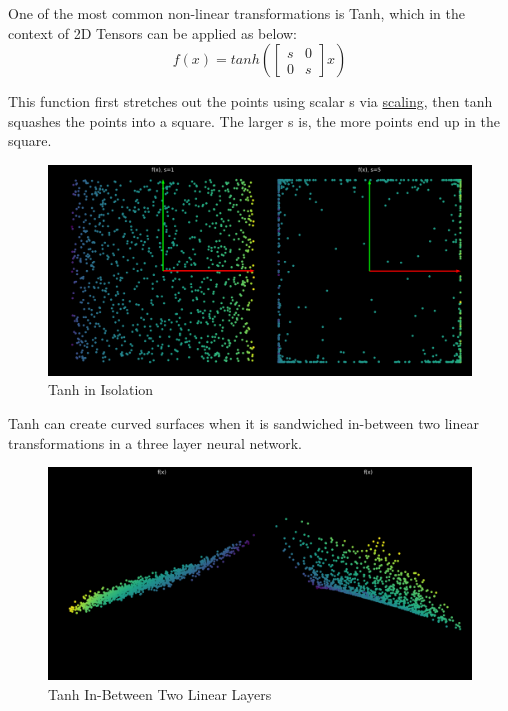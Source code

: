 One of the most common non-linear transformations is Tanh, which in the context of 2D Tensors can be applied as below:
\[f(x) = tanh(
\begin{bmatrix}
s & 0\\
0 & s
\end{bmatrix}
x)\]

This function first stretches out the points using scalar s via \hyperref[subsubsec:Scaling]{scaling}, then tanh squashes the points into a square.
The larger s is, the more points end up in the square.

\begin{figure}[h!]
\begin{center}
\includegraphics{students/SP19_DL_Lab_1_Notes/images/tanh.png}
\end{center} 
\caption{Tanh in Isolation}
\label{fig:mon}
\end{figure}
\FloatBarrier

Tanh can create curved surfaces when it is sandwiched in-between two linear transformations in a three layer neural network.

\begin{figure}[h!]
\begin{center}
\includegraphics{students/SP19_DL_Lab_1_Notes/images/tanh_sandwich.png}
\end{center} 
\caption{Tanh In-Between Two Linear Layers}
\label{fig:mon}
\end{figure}
\FloatBarrier
